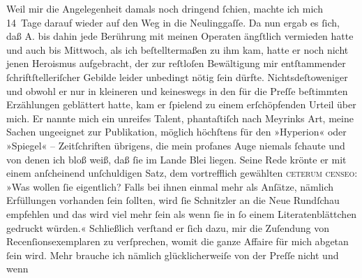 \begin{ledgroupsized}[t]{13cm}
                    Weil mir die Angelegenheit {\pb}damals noch dringend
                    ſchien, machte ich mich 14 Tage darauf wieder auf den Weg in die Neulinggaſſe. Da nun ergab es ſich, daß A. bis dahin jede Berührung mit meinen Operaten ängſtlich
                    vermieden hatte und auch bis Mittwoch, als ich beſtelltermaßen zu
                    ihm kam, hatte er noch nicht jenen Heroismus aufgebracht, der zur reſtloſen
                    Bewältigung mir entſtammender ſchriftſtelleriſcher Gebilde leider unbedingt
                    nötig ſein dürfte. Nichtsdeſtoweniger und obwohl er nur in kleineren und
                    keineswegs in den für die Preſſe beſtimmten
                    Erzählungen geblättert hatte, kam er ſpielend zu einem erſchöpfenden Urteil über
                    mich. Er nannte mich ein unreifes Talent, phantaſtiſch nach Meyrinks Art, meine Sachen ungeeignet zur Publikation,
                    möglich höchſtens für den »Hyperion« oder »Spiegel« – Zeitſchriften {\pb}übrigens, die mein profanes Auge niemals ſchaute und
                    von denen ich bloß weiß, daß ſie im Lande Blei liegen. Seine Rede krönte er mit einem anſcheinend unſchuldigen
                    Satz, dem vortrefflich gewählten \textsc{ceterum censeo}: »Was
                    wollen ſie eigentlich? Falls bei ihnen einmal mehr als Anſätze, nämlich
                    Erfüllungen vorhanden ſein ſollten, wird ſie Schnitzler an die Neue Rundſchau empfehlen und das wird viel mehr ſein als
                    wenn ſie in ſo einem Literatenblättchen gedruckt würden.« Schließlich verſtand
                    er ſich dazu, mir die Zuſendung von Recenſionsexemplaren zu verſprechen, womit
                    die ganze Affaire für mich abgetan ſein wird. Mehr brauche ich nämlich
                    glücklicherweiſe von der Preſſe nicht und wenn

\end{ledgroupsized}
